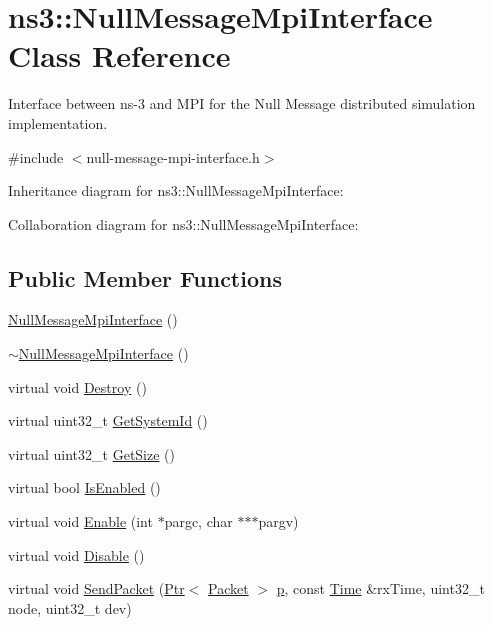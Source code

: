 \hypertarget{classns3_1_1NullMessageMpiInterface}{}\section{ns3\+:\+:Null\+Message\+Mpi\+Interface Class Reference}
\label{classns3_1_1NullMessageMpiInterface}


Interface between ns-\/3 and M\+PI for the Null Message distributed simulation implementation.  




{\ttfamily \#include $<$null-\/message-\/mpi-\/interface.\+h$>$}



Inheritance diagram for ns3\+:\+:Null\+Message\+Mpi\+Interface\+:


Collaboration diagram for ns3\+:\+:Null\+Message\+Mpi\+Interface\+:
\subsection*{Public Member Functions}
\begin{DoxyCompactItemize}
\item 
\hyperlink{classns3_1_1NullMessageMpiInterface_a888a1dfbb86df5c281e78d07587cd768}{Null\+Message\+Mpi\+Interface} ()
\item 
\hyperlink{classns3_1_1NullMessageMpiInterface_a7dc0735c9fd7d02449d9c72283db3d5b}{$\sim$\+Null\+Message\+Mpi\+Interface} ()
\item 
virtual void \hyperlink{classns3_1_1NullMessageMpiInterface_a06dfa62339e8e66771e871f3ac539be6}{Destroy} ()
\item 
virtual uint32\+\_\+t \hyperlink{classns3_1_1NullMessageMpiInterface_acae7c11672daaac25e6819b76337ae48}{Get\+System\+Id} ()
\item 
virtual uint32\+\_\+t \hyperlink{classns3_1_1NullMessageMpiInterface_acf20c96eac19fb2e5f082e83523a2df7}{Get\+Size} ()
\item 
virtual bool \hyperlink{classns3_1_1NullMessageMpiInterface_a7f7b4f199007ebd7ea75ff111a43e831}{Is\+Enabled} ()
\item 
virtual void \hyperlink{classns3_1_1NullMessageMpiInterface_afa4ce22542772a893e234c7c9c58cf5f}{Enable} (int $\ast$pargc, char $\ast$$\ast$$\ast$pargv)
\item 
virtual void \hyperlink{classns3_1_1NullMessageMpiInterface_a00ad9d086e977d0c3698961d44f15631}{Disable} ()
\item 
virtual void \hyperlink{classns3_1_1NullMessageMpiInterface_a5bef503661f681b69f0c69abda3ed25a}{Send\+Packet} (\hyperlink{classns3_1_1Ptr}{Ptr}$<$ \hyperlink{classns3_1_1Packet}{Packet} $>$ \hyperlink{lte__link__budget__x2__handover__measures_8m_ac9de518908a968428863f829398a4e62}{p}, const \hyperlink{classns3_1_1Time}{Time} \&rx\+Time, uint32\+\_\+t node, uint32\+\_\+t dev)
\end{DoxyCompactItemize}
